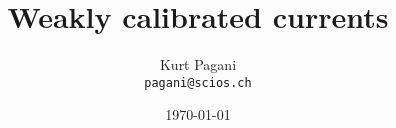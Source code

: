 \documentclass[11pt,a4paper]{article}
\begin{document}
\newcommand{\Norm}[1]{\vert\vert#1\vert\vert} %
\newcommand{\Abs}[1]{\vert#1\vert} %
\newcommand{\Dotp}[2]{\langle#1,#2\rangle} %
\newcommand{\RR}{\mathbb{R}} %
\newcommand{\FT}[1]{\int_{\RR^n} #1 e^{-i\Dotp{k}{x}} dm(x)} %
\newcommand{\IFT}[1]{\int_{\RR^n}\hat#1 e^{i\Dotp{k}{x}} dm(k)} %

\newtheorem{theorem}{Theorem}
\newtheorem{proposition}{Proposition}
\newtheorem{corollary}{Corollary}
\newtheorem{definition}{Definition}
\newcommand{\LL}{{\cal L}} %

\newcommand{\Current}[1]{\llbracket#1\rrbracket}
\newcommand{\DD}{{\cal D}}

\title{Weakly calibrated currents}
\author{Kurt Pagani\\{\tt pagani@scios.ch}}
\date{\today}
\maketitle
{}
\end{document}
